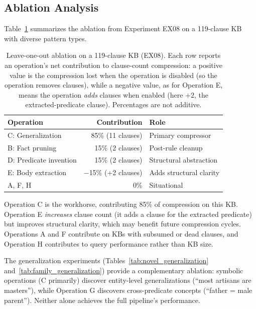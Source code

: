 \documentclass[10pt,conference]{IEEEtran}
\begin{document}
\subsection{Ablation Analysis}
\label{sec:ablation}

Table~\ref{tab:ablation_ops} summarizes the ablation from Experiment EX08 on a 119-clause KB with diverse pattern types.

\begin{table}[t]
\centering
\caption{Leave-one-out ablation on a 119-clause KB (EX08). Each row reports an operation's net contribution to clause-count compression: a positive value is the compression lost when the operation is disabled (so the operation removes clauses), while a negative value, as for Operation E, means the operation \emph{adds} clauses when enabled (here $+2$, the extracted-predicate clause). Percentages are not additive.}
\label{tab:ablation_ops}
\begin{tabular}{lrl}
\toprule
\textbf{Operation} & \textbf{Contribution} & \textbf{Role} \\
\midrule
C: Generalization     & 85\% (11 clauses) & Primary compressor \\
B: Fact pruning       & 15\% (2 clauses)  & Post-rule cleanup \\
D: Predicate invention & 15\% (2 clauses) & Structural abstraction \\
E: Body extraction    & $-$15\% (+2 clauses) & Adds structural clarity \\
A, F, H              & 0\%               & Situational \\
\bottomrule
\end{tabular}
\end{table}

Operation C is the workhorse, contributing 85\% of compression on this KB. Operation E \emph{increases} clause count (it adds a clause for the extracted predicate) but improves structural clarity, which may benefit future compression cycles. Operations A and F contribute on KBs with subsumed or dead clauses, and Operation H contributes to query performance rather than KB size.

The generalization experiments (Tables~\ref{tab:novel_generalization} and~\ref{tab:family_generalization}) provide a complementary ablation: symbolic operations (C primarily) discover entity-level generalizations (``most artisans are masters''), while Operation G discovers cross-predicate concepts (``father = male parent''). Neither alone achieves the full pipeline's performance.
\end{document}
